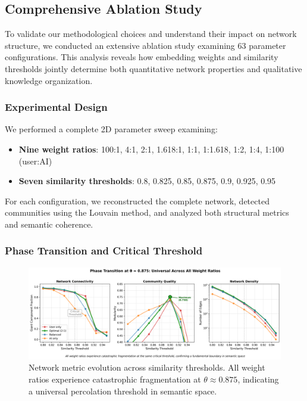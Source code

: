
\subsection{Comprehensive Ablation Study}

To validate our methodological choices and understand their impact on network structure, we conducted an extensive ablation study examining 63 parameter configurations. This analysis reveals how embedding weights and similarity thresholds jointly determine both quantitative network properties and qualitative knowledge organization.

\subsubsection{Experimental Design}

We performed a complete 2D parameter sweep examining:
\begin{itemize}
    \item \textbf{Nine weight ratios}: 100:1, 4:1, 2:1, 1.618:1, 1:1, 1:1.618, 1:2, 1:4, 1:100 (user:AI)
    \item \textbf{Seven similarity thresholds}: 0.8, 0.825, 0.85, 0.875, 0.9, 0.925, 0.95
\end{itemize}

For each configuration, we reconstructed the complete network, detected communities using the Louvain method, and analyzed both structural metrics and semantic coherence.

\subsubsection{Phase Transition and Critical Threshold}

\begin{figure}[h]
\centering
\includegraphics[width=\textwidth]{./images/threshold_evolution_clean.png}
\caption{Network metric evolution across similarity thresholds. All weight ratios experience catastrophic fragmentation at $\theta \approx 0.875$, indicating a universal percolation threshold in semantic space.}
\label{fig:phase_transition}
\end{figure}

